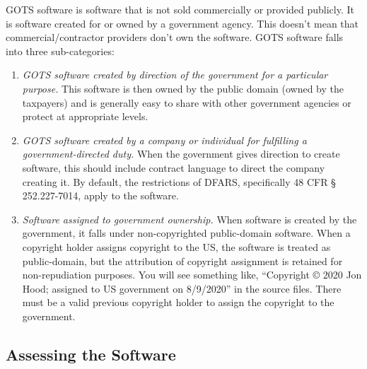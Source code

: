 GOTS software is software that is not sold commercially or provided publicly. It is software created for or owned by a government agency. This doesn’t mean that commercial/contractor providers don’t own the software. GOTS software falls into three sub-categories:
\begin{enumerate}
	\item \textit{GOTS software created by direction of the government for a particular purpose.} This software is then owned by the public domain (owned by the taxpayers) and is generally easy to share with other government agencies or protect at appropriate levels.
	\item \textit{GOTS software created by a company or individual for fulfilling a government-directed duty.} When the government gives direction to create software, this should include contract language to direct the company creating it. By default, the restrictions of DFARS, specifically 48 CFR § 252.227-7014, apply to the software.
	\item \textit{Software assigned to government ownership.} When software is created by the government, it falls under non-copyrighted public-domain software. When a copyright holder assigns copyright to the US, the software is treated as public-domain, but the attribution of copyright assignment is retained for non-repudiation purposes. You will see something like, ``Copyright © 2020 Jon Hood; assigned to US government on 8/9/2020'' in the source files. There must be a valid previous copyright holder to assign the copyright to the government.
\end{enumerate}

\subsection{Assessing the Software}

